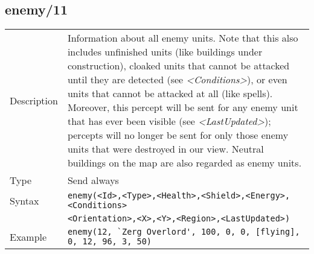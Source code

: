 \subsection{enemy/11}
\begin{tabularx}{\textwidth}{lX}
 Description & Information about all enemy units. Note that this also includes unfinished units (like buildings under construction), cloaked units that cannot be attacked until they are detected (see \mbox{\textit{<Conditions>}}), or even units that cannot be attacked at all (like spells). Moreover, this percept will be sent for any enemy unit that has ever been visible (see \mbox{\textit{<LastUpdated>}}); percepts will no longer be sent for only those enemy units that were destroyed in our view. Neutral buildings on the map are also regarded as enemy units. \\
 Type & Send always \\
 Syntax & \verb|enemy(<Id>,<Type>,<Health>,<Shield>,<Energy>,<Conditions>| \\ & \quad \verb|<Orientation>,<X>,<Y>,<Region>,<LastUpdated>)| \\
 Example & \verb|enemy(12, `Zerg Overlord', 100, 0, 0, [flying], 0, 12, 96, 3, 50)| \\
 \end{tabularx}
